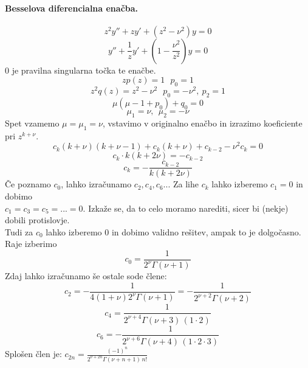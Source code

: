 \documentclass[a4paper]{article}
\begin{document}
\paragraph{Besselova diferencialna enačba.}
$$z^2y'' + zy' + (z^2 - \nu^2) y = 0$$
$$y'' + \frac{1}{z}y' + \left(1 - \frac{\nu^2}{z^2}\right)y = 0$$
$0$ je pravilna singularna točka te enačbe.
$$zp(z) = 1~~~p_0 = 1$$
$$z^2q(z) = z^2 - \nu^2~~~p_0 = -\nu^2,~p_2 = 1$$
$$\mu(\mu-1+p_0)+q_0=0$$
$$\mu_1 = \nu,~~\mu_2 = -\nu$$
Spet vzamemo $\mu = \mu_1 = \nu$, vstavimo v originalno enačbo in izrazimo koeficiente pri $z^{k+\nu}$.
$$c_k(k+\nu)(k+\nu-1)+c_k(k+\nu) + c_{k-2} - \nu^2c_k = 0$$
$$c_k\cdot k(k+2\nu) =-c_{k-2}$$
$$c_k = -\frac{c_{k-2}}{k(k+2\nu)}$$
Če poznamo $c_0$, lahko izračunamo $c_2, c_4, c_6 ...$ Za lihe $c_k$ lahko izberemo $c_1 = 0$ in dobimo \\ $c_1 = c_3 = c_5 = ... = 0$.
Izkaže se, da to celo moramo narediti, sicer bi (nekje) dobili protislovje. \\
Tudi za $c_0$ lahko izberemo $0$ in dobimo validno rešitev, ampak to je dolgočasno. Raje izberimo
$$c_0 = \frac{1}{2^\nu\Gamma(\nu + 1)}$$
Zdaj lahko izračunamo še ostale sode člene:
$$c_2 = -\frac{1}{4(1 + \nu)2^\nu\Gamma(\nu+1)} = -\frac{1}{2^{\nu + 2}\Gamma(\nu + 2)}$$
$$c_4 = \frac{1}{2^{\nu + 4} \Gamma(\nu + 3) \, (1 \cdot 2)}$$
$$c_6 = -\frac{1}{2^{\nu + 6} \Gamma(\nu + 4) \, (1 \cdot 2 \cdot 3)}$$
Splošen člen je: $\displaystyle{c_{2n} = \frac{(-1)^n}{2^{\nu + 2n}\Gamma(\nu + n + 1)\,n!}}$
\end{document}
